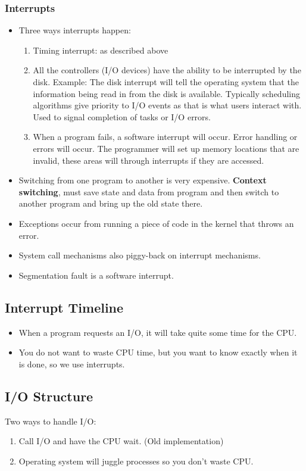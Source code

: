 \documentclass[]{article}
\begin{document}
\subsubsection{Interrupts}
\begin{itemize}
\item Three ways interrupts happen:
\begin{enumerate}
\item Timing interrupt: as described above
\item All the controllers (I/O devices) have the ability to be interrupted by
the disk. Example: The disk interrupt will tell the operating system that the
information being read in from the disk is available. Typically scheduling
algorithms give priority to I/O events as that is what users interact with. Used
to signal completion of tasks or I/O errors.
\item When a program fails, a software interrupt will occur. Error handling or
errors will occur. The programmer will set up memory locations that are invalid,
these areas will through interrupts if they are accessed.
\end{enumerate}
\item Switching from one program to another is very expensive. \textbf{Context
switching}, must save state and data from program and then switch to another
program and bring up the old state there.
\item Exceptions occur from running a piece of code in the kernel that throws an
error.
\item System call mechanisms also piggy-back on interrupt mechanisms.
\item Segmentation fault is a software interrupt.
\end{itemize}

\subsection{Interrupt Timeline}
\begin{itemize}
\item When a program requests an I/O, it will take quite some time for the CPU.
\item You do not want to waste CPU time, but you want to know exactly when it is
done, so we use interrupts.
\end{itemize}

\subsection{I/O Structure}
Two ways to handle I/O:
\begin{enumerate}
\item Call I/O and have the CPU wait. (Old implementation)
\item Operating system will juggle processes so you don't waste CPU.
\end{enumerate}
\end{document}
